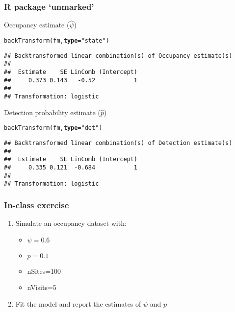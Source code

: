 \documentclass[color=usenames,dvipsnames]{beamer}\usepackage[]{graphicx}\usepackage[]{color}
\makeatletter
\newcommand{\hlstr}[1]{\textcolor[rgb]{0.749,0.012,0.012}{#1}}%
\newcommand{\hlstd}[1]{\textcolor[rgb]{0,0,0}{#1}}%
\newcommand{\hlkwc}[1]{\textcolor[rgb]{0,0,0}{\textbf{#1}}}%
\newcommand{\hlkwd}[1]{\textcolor[rgb]{0.004,0.004,0.506}{#1}}%
\newenvironment{kframe}{%
 \def\at@end@of@kframe{}%
 \ifinner\ifhmode%
  \def\at@end@of@kframe{\end{minipage}}%
  \begin{minipage}{\columnwidth}%
 \fi\fi%
 \def\FrameCommand##1{\hskip\@totalleftmargin \hskip-\fboxsep
 \colorbox{shadecolor}{##1}\hskip-\fboxsep
     \hskip-\linewidth \hskip-\@totalleftmargin \hskip\columnwidth}%
 \MakeFramed {\advance\hsize-\width
   \@totalleftmargin\z@ \linewidth\hsize
   \@setminipage}}%
 {\par\unskip\endMakeFramed%
 \at@end@of@kframe}
\newenvironment{knitrout}{}{} %
\makeatother
\begin{document}
\begin{frame}[fragile]
  \frametitle{R package `unmarked'}
Occupancy estimate ($\hat{\psi}$)
\begin{knitrout}\footnotesize
{}\color{fgcolor}\begin{kframe}
\begin{alltt}
\hlkwd{backTransform}\hlstd{(fm,} \hlkwc{type}\hlstd{=}\hlstr{"state"}\hlstd{)}
\end{alltt}
\begin{verbatim}
## Backtransformed linear combination(s) of Occupancy estimate(s)
## 
##  Estimate    SE LinComb (Intercept)
##     0.373 0.143   -0.52           1
## 
## Transformation: logistic
\end{verbatim}
\end{kframe}
\end{knitrout}
\pause
\vfill
Detection probability estimate ($\hat{p}$)
\begin{knitrout}\footnotesize
{}\color{fgcolor}\begin{kframe}
\begin{alltt}
\hlkwd{backTransform}\hlstd{(fm,} \hlkwc{type}\hlstd{=}\hlstr{"det"}\hlstd{)}
\end{alltt}
\begin{verbatim}
## Backtransformed linear combination(s) of Detection estimate(s)
## 
##  Estimate    SE LinComb (Intercept)
##     0.335 0.121  -0.684           1
## 
## Transformation: logistic
\end{verbatim}
\end{kframe}
\end{knitrout}
\end{frame}



\begin{frame}
  \frametitle{In-class exercise}
  \begin{enumerate}
    \item Simulate an occupancy dataset with:
      \begin{itemize}
        \item $\psi=0.6$
        \item $p=0.1$
        \item nSites=100
        \item nVisits=5
      \end{itemize}
    \item Fit the model and report the estimates of $\psi$ and $p$
  \end{enumerate}
\end{frame}
\end{document}
